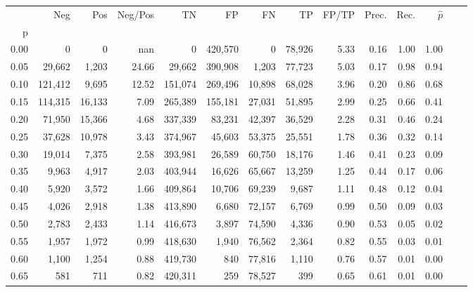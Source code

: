 \begin{tabular}{rrrrrrrrrrrrrr}
\toprule
{} &      Neg &     Pos & Neg/Pos &       TN &       FP &      FN &      TP & FP/TP & Prec. &  Rec. & $\hat{p}$ \\
p    &          &         &         &          &          &         &         &       &       &       &           \\
\midrule
0.00 &        0 &       0 &     nan &        0 &  420,570 &       0 &  78,926 &  5.33 &  0.16 &  1.00 &      1.00 \\
0.05 &   29,662 &   1,203 &   24.66 &   29,662 &  390,908 &   1,203 &  77,723 &  5.03 &  0.17 &  0.98 &      0.94 \\
0.10 &  121,412 &   9,695 &   12.52 &  151,074 &  269,496 &  10,898 &  68,028 &  3.96 &  0.20 &  0.86 &      0.68 \\
0.15 &  114,315 &  16,133 &    7.09 &  265,389 &  155,181 &  27,031 &  51,895 &  2.99 &  0.25 &  0.66 &      0.41 \\
0.20 &   71,950 &  15,366 &    4.68 &  337,339 &   83,231 &  42,397 &  36,529 &  2.28 &  0.31 &  0.46 &      0.24 \\
0.25 &   37,628 &  10,978 &    3.43 &  374,967 &   45,603 &  53,375 &  25,551 &  1.78 &  0.36 &  0.32 &      0.14 \\
0.30 &   19,014 &   7,375 &    2.58 &  393,981 &   26,589 &  60,750 &  18,176 &  1.46 &  0.41 &  0.23 &      0.09 \\
0.35 &    9,963 &   4,917 &    2.03 &  403,944 &   16,626 &  65,667 &  13,259 &  1.25 &  0.44 &  0.17 &      0.06 \\
0.40 &    5,920 &   3,572 &    1.66 &  409,864 &   10,706 &  69,239 &   9,687 &  1.11 &  0.48 &  0.12 &      0.04 \\
0.45 &    4,026 &   2,918 &    1.38 &  413,890 &    6,680 &  72,157 &   6,769 &  0.99 &  0.50 &  0.09 &      0.03 \\
0.50 &    2,783 &   2,433 &    1.14 &  416,673 &    3,897 &  74,590 &   4,336 &  0.90 &  0.53 &  0.05 &      0.02 \\
0.55 &    1,957 &   1,972 &    0.99 &  418,630 &    1,940 &  76,562 &   2,364 &  0.82 &  0.55 &  0.03 &      0.01 \\
0.60 &    1,100 &   1,254 &    0.88 &  419,730 &      840 &  77,816 &   1,110 &  0.76 &  0.57 &  0.01 &      0.00 \\
0.65 &      581 &     711 &    0.82 &  420,311 &      259 &  78,527 &     399 &  0.65 &  0.61 &  0.01 &      0.00 \\

\end{tabular}
